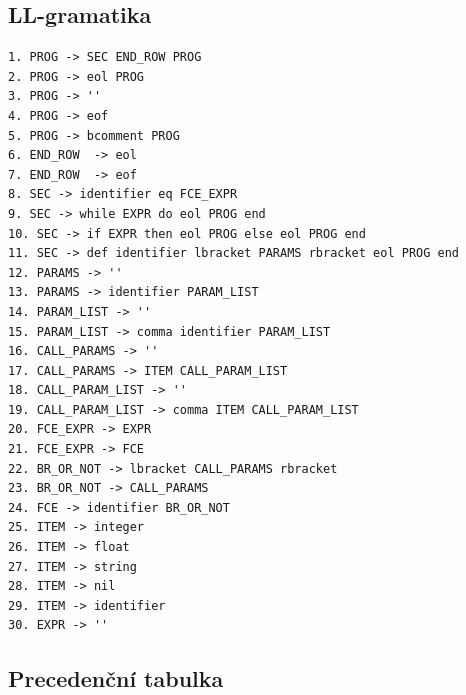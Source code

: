 \documentclass[a4paper, 12pt]{article}
\begin{document}
\subsection{LL-gramatika} \label{subsec:llgram}
\begin{verbatim}
1. PROG -> SEC END_ROW PROG
2. PROG -> eol PROG
3. PROG -> ''
4. PROG -> eof
5. PROG -> bcomment PROG
6. END_ROW  -> eol
7. END_ROW  -> eof
8. SEC -> identifier eq FCE_EXPR
9. SEC -> while EXPR do eol PROG end
10. SEC -> if EXPR then eol PROG else eol PROG end
11. SEC -> def identifier lbracket PARAMS rbracket eol PROG end
12. PARAMS -> ''
13. PARAMS -> identifier PARAM_LIST
14. PARAM_LIST -> ''
15. PARAM_LIST -> comma identifier PARAM_LIST
16. CALL_PARAMS -> ''
17. CALL_PARAMS -> ITEM CALL_PARAM_LIST 
18. CALL_PARAM_LIST -> ''
19. CALL_PARAM_LIST -> comma ITEM CALL_PARAM_LIST 
20. FCE_EXPR -> EXPR
21. FCE_EXPR -> FCE
22. BR_OR_NOT -> lbracket CALL_PARAMS rbracket 
23. BR_OR_NOT -> CALL_PARAMS 
24. FCE -> identifier BR_OR_NOT
25. ITEM -> integer
26. ITEM -> float
27. ITEM -> string
28. ITEM -> nil
29. ITEM -> identifier
30. EXPR -> ''

\end{verbatim}

\newpage

    \begin{center}
    \end{center}

\newpage

\subsection{Precedenční tabulka} \label{subsec:precetable}


\begin{figure}[ht]
    \begin{center}
    \end{center}
\end{figure}               
\end{document}

